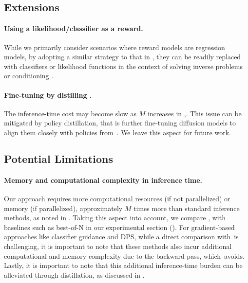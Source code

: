 \vspace{-2mm}
\subsection{Extensions }\label{sec:extension}
\vspace{-2mm}

\paragraph{Using a likelihood/classifier as a reward.} While we primarily consider scenarios where reward models are regression models, by adopting a similar strategy to that in \citet{zhao2024adding}, they can be readily replaced with classifiers or likelihood functions in the context of solving inverse problems or conditioning \citep{chung2022diffusion,bansal2023universal}.

\vspace{-2mm}
\paragraph{Fine-tuning by distilling \alg.}  The inference-time cost may become slow as $M$ increases in \alg,. This issue can be mitigated by policy distillation, that is further fine-tuning diffusion models to align them closely with policies from \alg\,\citep{salimans2022progressive,kim2023consistency}. We leave this aspect for future work.





\vspace{-2mm}
\subsection{Potential Limitations}\label{sec:limitation}
\vspace{-2mm}

\paragraph{Memory and computational complexity in inference time.}  Our approach requires more computational resources (if not parallelized) or memory (if parallelized), approximately $M$ times more than standard inference methods, as noted in . Taking this aspect into account, we compare \alg, with baselines such as best-of-N in our experimental section (). For gradient-based approaches like classifier guidance and DPS, while a direct comparison with \alg\,is challenging, it is important to note that these methods also incur additional computational and memory complexity due to the backward pass, which \alg\,avoids. Lastly, it is important to note that this additional inference-time burden can be alleviated through distillation, as discussed in .


